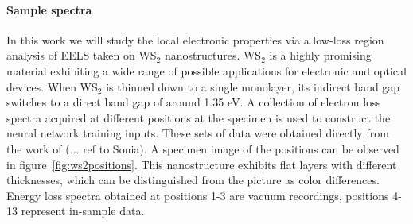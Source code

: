 \paragraph{Sample spectra}
%
In this work we will study the local electronic properties
via a low-loss region analysis of EELS taken on
WS$_2$ nanostructures.
%
WS$_2$ is a highly promising material exhibiting a wide range of 
possible applications for electronic and optical devices.
%
When WS$_2$ is thinned down to a single monolayer, its 
indirect band gap switches to a direct band gap of around 1.35 eV.
%
A collection of electron loss spectra acquired at different positions 
at the specimen is used to construct the neural network training inputs. 
%
These sets of data were obtained directly from the work of (... ref to Sonia).
%
A specimen image of the positions can be observed in figure~\ref{fig:ws2positions}.  
This nanostructure exhibits flat layers with different thicknesses, which 
can be distinguished from the picture as color differences.
%
Energy loss spectra obtained at positions 1-3 are vacuum recordings, 
positions 4-13 represent in-sample data.


